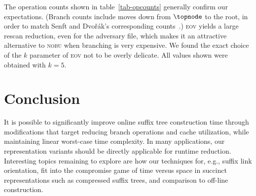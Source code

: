 \documentclass{llncs}
\newcommand\nobu{\textsc{nobu}\xspace}
\newcommand\eov{\textsc{eov}\xspace}
\begin{document}
The operation counts shown in table~\ref{tab-opcounts} generally confirm our
expectations.  (Branch counts include moves down from $\topnode$ to the
root, in order to match Senft and Dvořák's corresponding
counts~\cite{SenftBranching}.) \eov yields a large rescan reduction, even for the adversary
file, which makes it an attractive alternative to \nobu when branching is very
expensive.  We found the exact choice of the $k$ parameter of \eov not to be
overly delicate. All values shown were obtained with $k=5$.




\section{Conclusion}\label{sec-concl}

It is possible to significantly improve online suffix tree construction time  
through modifications that target reducing branch operations and cache  
utilization, while maintaining linear worst-case time complexity. In many  
applications, our representation variants should be directly applicable for
runtime reduction. Interesting topics remaining to explore are how our
techniques for, e.g., suffix link orientation, fit into the compromise game of
time versus space in succinct representations such as compressed suffix trees,
and comparison to off-line construction.
\end{document}
